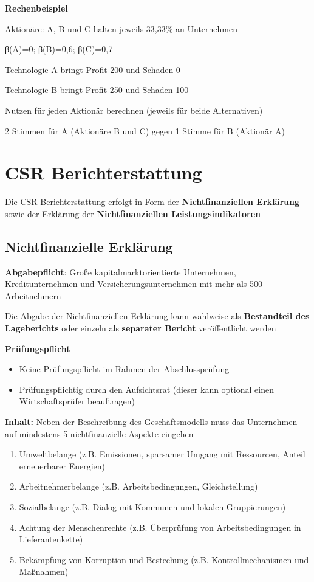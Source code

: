 \documentclass[
]{article}
\providecommand{\tightlist}{%
  \setlength{\itemsep}{0pt}\setlength{\parskip}{0pt}}
\begin{document}
\textbf{Rechenbeispiel}

Aktionäre: A, B und C halten jeweils 33,33\% an Unternehmen

β(A)=0; β(B)=0,6; β(C)=0,7

Technologie A bringt Profit 200 und Schaden 0

Technologie B bringt Profit 250 und Schaden 100

Nutzen für jeden Aktionär berechnen (jeweils für beide Alternativen)

2 Stimmen für A (Aktionäre B und C) gegen 1 Stimme für B (Aktionär A)

\hypertarget{csr-berichterstattung}{%
\section{CSR Berichterstattung}\label{csr-berichterstattung}}

Die CSR Berichterstattung erfolgt in Form der \textbf{Nichtfinanziellen
Erklärung} sowie der Erklärung der \textbf{Nichtfinanziellen
Leistungsindikatoren}

\hypertarget{nichtfinanzielle-erkluxe4rung}{%
\subsection{Nichtfinanzielle
Erklärung}\label{nichtfinanzielle-erkluxe4rung}}

\textbf{Abgabepflicht}: Große kapitalmarktorientierte Unternehmen,
Kreditunternehmen und Versicherungsunternehmen mit mehr als 500
Arbeitnehmern

Die Abgabe der Nichtfinanziellen Erklärung kann wahlweise als
\textbf{Bestandteil des Lageberichts} oder einzeln als \textbf{separater
Bericht} veröffentlicht werden

\textbf{Prüfungspflicht}

\begin{itemize}
\tightlist
\item
  Keine Prüfungspflicht im Rahmen der Abschlussprüfung
\item
  Prüfungspflichtig durch den Aufsichtsrat (dieser kann optional einen
  Wirtschaftsprüfer beauftragen)
\end{itemize}

\textbf{Inhalt: }Neben der Beschreibung des Geschäftsmodells muss das
Unternehmen auf mindestens 5 nichtfinanzielle Aspekte eingehen

\begin{enumerate}
\def\labelenumi{\arabic{enumi}.}
\tightlist
\item
  Umweltbelange (z.B. Emissionen, sparsamer Umgang mit Ressourcen,
  Anteil erneuerbarer Energien)
\item
  Arbeitnehmerbelange (z.B. Arbeitsbedingungen, Gleichstellung)
\item
  Sozialbelange (z.B. Dialog mit Kommunen und lokalen Gruppierungen)
\item
  Achtung der Menschenrechte (z.B. Überprüfung von Arbeitsbedingungen in
  Lieferantenkette)
\item
  Bekämpfung von Korruption und Bestechung (z.B. Kontrollmechanismen und
  Maßnahmen)
\end{enumerate}
\end{document}
